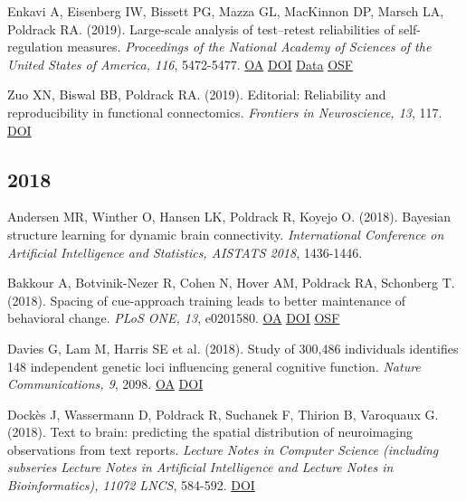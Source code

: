 \documentclass[10pt, letterpaper]{article}
\begin{document}
Enkavi A, Eisenberg IW, Bissett PG, Mazza GL, MacKinnon DP, Marsch LA, Poldrack RA.  (2019). Large-scale analysis of test–retest reliabilities of self-regulation measures. \textit{Proceedings of the National Academy of Sciences of the United States of America, 116}, 5472-5477. \href{https://www.ncbi.nlm.nih.gov/pmc/articles/PMC6431228}{OA} \href{https://doi.org/10.1073/pnas.1818430116}{DOI} \href{https://github.com/IanEisenberg/Self_Regulation_Ontology/tree/master/Data}{Data} \href{https://osf.io/5mjns/}{OSF} \vspace{2mm}

Zuo XN, Biswal BB, Poldrack RA.  (2019). Editorial: Reliability and reproducibility in functional connectomics. \textit{Frontiers in Neuroscience, 13}, 117. \href{https://doi.org/10.3389/fnins.2019.00117}{DOI} \vspace{2mm}

\subsection*{2018}Andersen MR, Winther O, Hansen LK, Poldrack R, Koyejo O.  (2018). Bayesian structure learning for dynamic brain connectivity. \textit{International Conference on Artificial Intelligence and Statistics, AISTATS 2018}, 1436-1446. \vspace{2mm}

Bakkour A, Botvinik-Nezer R, Cohen N, Hover AM, Poldrack RA, Schonberg T.  (2018). Spacing of cue-approach training leads to better maintenance of behavioral change. \textit{PLoS ONE, 13}, e0201580. \href{https://www.ncbi.nlm.nih.gov/pmc/articles/PMC6066248}{OA} \href{https://doi.org/10.1371/journal.pone.0201580}{DOI} \href{https://osf.io/fdvrk/}{OSF} \vspace{2mm}

Davies G, Lam M, Harris SE et al. (2018). Study of 300,486 individuals identifies 148 independent genetic loci influencing general cognitive function. \textit{Nature Communications, 9}, 2098. \href{https://www.ncbi.nlm.nih.gov/pmc/articles/PMC5974083}{OA} \href{https://doi.org/10.1038/s41467-018-04362-x}{DOI} \vspace{2mm}

Dockès J, Wassermann D, Poldrack R, Suchanek F, Thirion B, Varoquaux G.  (2018). Text to brain: predicting the spatial distribution of neuroimaging observations from text reports. \textit{Lecture Notes in Computer Science (including subseries Lecture Notes in Artificial Intelligence and Lecture Notes in Bioinformatics), 11072 LNCS}, 584-592. \href{https://doi.org/10.1007/978-3-030-00931-1_67}{DOI} \vspace{2mm}
\end{document}
